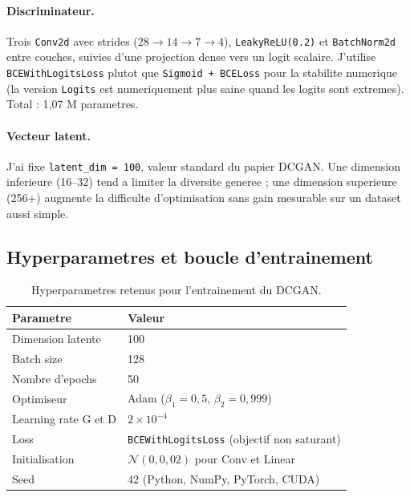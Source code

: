 \documentclass[11pt,a4paper]{article}
\begin{document}
\paragraph{Discriminateur.} Trois \texttt{Conv2d} avec strides ($28 \to 14 \to 7 \to 4$), \texttt{LeakyReLU(0.2)} et \texttt{BatchNorm2d} entre couches, suivies d'une projection dense vers un logit scalaire. J'utilise \texttt{BCEWithLogitsLoss} plutot que \texttt{Sigmoid + BCELoss} pour la stabilite numerique (la version \texttt{Logits} est numeriquement plus saine quand les logits sont extremes). Total : 1{,}07 M parametres.

\paragraph{Vecteur latent.} J'ai fixe \texttt{latent\_dim = 100}, valeur standard du papier DCGAN. Une dimension inferieure (16--32) tend a limiter la diversite generee ; une dimension superieure (256+) augmente la difficulte d'optimisation sans gain mesurable sur un dataset aussi simple.

\subsection{Hyperparametres et boucle d'entrainement}

\begin{table}[h]
    \centering
    \small
    \begin{tabular}{ll}
        \toprule
        \textbf{Parametre} & \textbf{Valeur} \\
        \midrule
        Dimension latente & 100 \\
        Batch size & 128 \\
        Nombre d'epochs & 50 \\
        Optimiseur & Adam ($\beta_1 = 0{,}5$, $\beta_2 = 0{,}999$) \\
        Learning rate G et D & $2 \times 10^{-4}$ \\
        Loss & \texttt{BCEWithLogitsLoss} (objectif non saturant) \\
        Initialisation & $\mathcal{N}(0, 0{,}02)$ pour Conv et Linear \\
        Seed & 42 (Python, NumPy, PyTorch, CUDA) \\
        \bottomrule
    \end{tabular}
    \caption{Hyperparametres retenus pour l'entrainement du DCGAN.}
\end{table}
\end{document}
